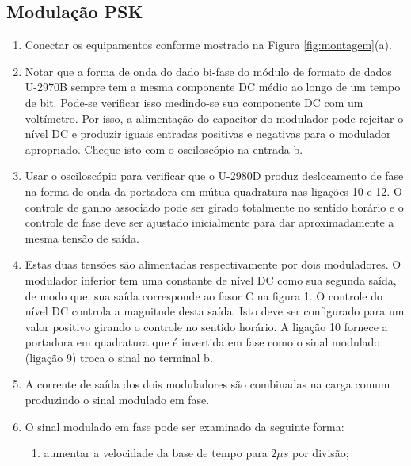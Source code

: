     \subsection{Modulação PSK}
        \begin{enumerate}
	        \item Conectar os equipamentos conforme mostrado na Figura \ref{fig:montagem}(a).
	        
	        \item Notar que a forma de onda do dado bi-fase do módulo de formato de dados U-2970B sempre tem a mesma componente DC médio ao longo de um tempo de bit. Pode-se verificar isso medindo-se sua componente DC com um voltímetro. Por isso, a alimentação do capacitor do modulador pode rejeitar o nível DC e produzir iguais entradas positivas e negativas para o modulador apropriado. Cheque isto com o osciloscópio na entrada b.
	        
	        \item Usar o osciloscópio para verificar que o U-2980D produz deslocamento de fase na forma de onda da portadora em mútua quadratura nas ligações 10 e 12. O controle de ganho associado pode ser girado totalmente no sentido horário e o controle de fase deve ser ajustado inicialmente para dar aproximadamente a mesma tensão de saída.
	        
	        \item Estas duas tensões são alimentadas respectivamente por dois moduladores. O modulador inferior tem uma constante de nível DC como sua segunda saída, de modo que, sua saída corresponde ao fasor C na figura 1. O controle do nível DC controla a magnitude desta saída. Isto deve ser configurado para um valor positivo girando o controle no sentido horário. A ligação 10 fornece a portadora em quadratura que é invertida em fase como o sinal modulado (ligação 9) troca o sinal no terminal b.
	        
	        \item A corrente de saída dos dois moduladores são combinadas na carga comum produzindo o sinal modulado em fase.
	        
	        \item O sinal modulado em fase pode ser examinado da seguinte forma:
		        
		        \begin{enumerate}
		        	\item aumentar a velocidade da base de tempo para $2 \mu s$ por divisão;
		        	

\end{enumerate}
\end{enumerate}

